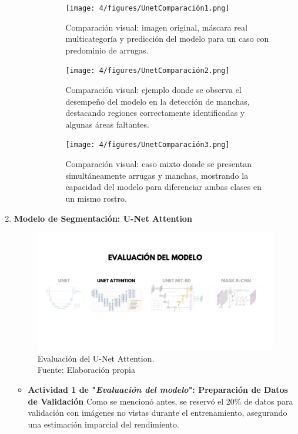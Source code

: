 \begin{enumerate}
\begin{itemize}
\begin{itemize}
  \vspace{0.2cm}
  \begin{figure}[H]
\centering
\texttt{[image: 4/figures/UnetComparación1.png]}
\caption{Comparación visual: imagen original, máscara real multicategoría y predicción del modelo para un caso con predominio de arrugas.}
\label{fig:validacion11}
\end{figure}

\begin{figure}[H]
\centering
\texttt{[image: 4/figures/UnetComparación2.png]}
\caption{Comparación visual: ejemplo donde se observa el desempeño del modelo en la detección de manchas, destacando regiones correctamente identificadas y algunas áreas faltantes.}
\label{fig:validacion22}
\end{figure}

\begin{figure}[H]
\centering
\texttt{[image: 4/figures/UnetComparación3.png]}
\caption{Comparación visual: caso mixto donde se presentan simultáneamente arrugas y manchas, mostrando la capacidad del modelo para diferenciar ambas clases en un mismo rostro.}
\label{fig:validacion33}
\end{figure}
\end{itemize}

  \end{itemize}
  \newpage
  \item \textbf{Modelo de Segmentación: U-Net Attention}
  \begin{figure}[H]
	\begin{center}
		\includegraphics[width=1\textwidth]{4/figures/evunetat.png}
		\caption[Evaluación del U-Net Attention]{Evaluación del U-Net Attention.\\
		Fuente: Elaboración propia}
		\label{4:figevunetat}
	\end{center}
\end{figure}
  \begin{itemize}
  \item\textbf{Actividad 1 de "\textit{Evaluación del modelo}": Preparación de Datos de Validación}
  Como se mencionó antes, se reservó el 20\% de datos para validación con imágenes no vistas durante el entrenamiento, asegurando una estimación imparcial del rendimiento.
  


\end{itemize}
\end{enumerate}

